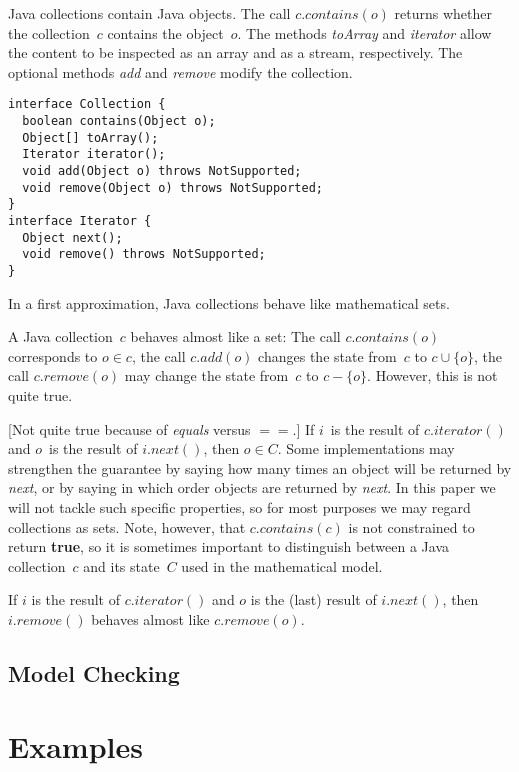 \documentclass[a4paper]{article}
\theoremstyle{slanted}
\theoremstyle{definition}
\theoremstyle{remark}
\begin{document}
Java collections contain Java objects.
The call $c.\mathit{contains}(o)$ returns whether the collection~$c$ contains the object~$o$.
The methods \textit{toArray} and \textit{iterator} allow the content to be inspected as an array and as a stream, respectively.
The optional methods \textit{add} and \textit{remove} modify the collection.

\begin{lstlisting}
interface Collection {
  boolean contains(Object o);
  Object[] toArray();
  Iterator iterator();
  void add(Object o) throws NotSupported;
  void remove(Object o) throws NotSupported;
}
interface Iterator {
  Object next();
  void remove() throws NotSupported;
}
\end{lstlisting}

In a first approximation, Java collections behave like mathematical sets.

A Java collection~$c$ behaves almost like a set:
The call $c.\mathit{contains}(o)$ corresponds to $o\in c$, the call $c.\mathit{add}(o)$ changes the state from~$c$ to $c\cup\{o\}$, the call $c.\mathit{remove}(o)$ may change the state from~$c$ to $c-\{o\}$.
However, this is not quite true.




[Not quite true because of \textit{equals} versus $==$.]
If $i$~is the result of $c.\mathit{iterator}()$ and $o$~is the result of $i.\mathit{next}()$, then $o\in C$.
Some implementations may strengthen the guarantee by saying how many times an object will be returned by \textit{next}, or by saying in which order objects are returned by \textit{next}.
In this paper we will not tackle such specific properties, so for most purposes we may regard collections as sets.
Note, however, that $c.\mathit{contains}(c)$ is not constrained to return \textbf{true}, so it is sometimes important to distinguish between a Java collection~$c$ and its state~$C$ used in the mathematical model.

If $i$ is the result of $c.\mathit{iterator}()$ and $o$ is the (last) result of $i.\mathit{next}()$, then $i.\mathit{remove}()$ behaves almost like $c.\mathit{remove}(o)$.

\subsection{Model Checking}


\section{Examples}
\end{document}
